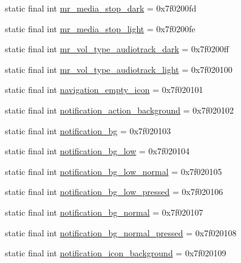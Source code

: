 \begin{CompactItemize}
\item 
static final int \hyperlink{classandroid_1_1support_1_1v4_1_1_r_1_1drawable_64a2dbfe24c3e99ec68676f0bfdec726}{mr\_\-media\_\-stop\_\-dark} = 0x7f0200fd
\item 
static final int \hyperlink{classandroid_1_1support_1_1v4_1_1_r_1_1drawable_d8f801045acbfcaae0ef1be79d6c4748}{mr\_\-media\_\-stop\_\-light} = 0x7f0200fe
\item 
static final int \hyperlink{classandroid_1_1support_1_1v4_1_1_r_1_1drawable_2cf0b8b53635167389c05021fec48d72}{mr\_\-vol\_\-type\_\-audiotrack\_\-dark} = 0x7f0200ff
\item 
static final int \hyperlink{classandroid_1_1support_1_1v4_1_1_r_1_1drawable_5a370520fa9dab804abe0c5a8114ca3a}{mr\_\-vol\_\-type\_\-audiotrack\_\-light} = 0x7f020100
\item 
static final int \hyperlink{classandroid_1_1support_1_1v4_1_1_r_1_1drawable_0806cec40bc3ecf9b2eb2048ac50a683}{navigation\_\-empty\_\-icon} = 0x7f020101
\item 
static final int \hyperlink{classandroid_1_1support_1_1v4_1_1_r_1_1drawable_31ecee22a54b8e309ef967b368a0679e}{notification\_\-action\_\-background} = 0x7f020102
\item 
static final int \hyperlink{classandroid_1_1support_1_1v4_1_1_r_1_1drawable_941b69f536ea9235076d9ef91031bb1e}{notification\_\-bg} = 0x7f020103
\item 
static final int \hyperlink{classandroid_1_1support_1_1v4_1_1_r_1_1drawable_ebaf09373263921a670a10abde37f5e4}{notification\_\-bg\_\-low} = 0x7f020104
\item 
static final int \hyperlink{classandroid_1_1support_1_1v4_1_1_r_1_1drawable_5b159f042a4ddaa547244b2ee62f86b9}{notification\_\-bg\_\-low\_\-normal} = 0x7f020105
\item 
static final int \hyperlink{classandroid_1_1support_1_1v4_1_1_r_1_1drawable_83cdc919d974e1f5e15b034b101c145c}{notification\_\-bg\_\-low\_\-pressed} = 0x7f020106
\item 
static final int \hyperlink{classandroid_1_1support_1_1v4_1_1_r_1_1drawable_11d39ed57f458afbe2c4625ed0fc3003}{notification\_\-bg\_\-normal} = 0x7f020107
\item 
static final int \hyperlink{classandroid_1_1support_1_1v4_1_1_r_1_1drawable_ebbe0451c6f2e2e4b939505bf7a8559a}{notification\_\-bg\_\-normal\_\-pressed} = 0x7f020108
\item 
static final int \hyperlink{classandroid_1_1support_1_1v4_1_1_r_1_1drawable_5dffc0047a723a7b2e76bfa7808b23da}{notification\_\-icon\_\-background} = 0x7f020109

\end{CompactItemize}
